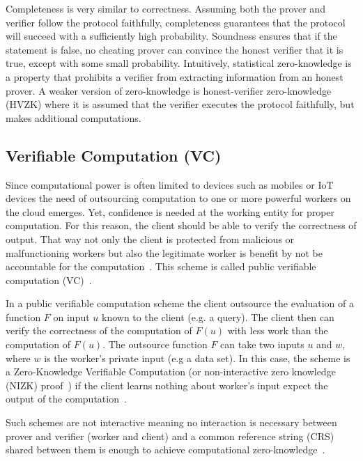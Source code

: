 Completeness is very similar to correctness. Assuming both the prover and verifier follow the protocol faithfully, completeness guarantees that the
protocol will succeed with a sufficiently high probability.
Soundness ensures that if the statement is false, no cheating prover can convince the honest verifier that it is true, except with some small probability.
Intuitively, statistical zero-knowledge is a property that prohibits a verifier from extracting information from an honest prover. A weaker version of zero-knowledge is honest-verifier zero-knowledge (HVZK) where it is assumed that the verifier executes the protocol faithfully, but makes additional computations.

\subsection{Verifiable Computation (VC)}
\label{zkp:vc}

Since computational power is often limited to devices such as mobiles or IoT devices the need of outsourcing computation to one or more powerful workers on the cloud emerges. Yet, confidence is needed at the working entity for proper computation. For this reason, the client should be able to verify the correctness of output. That way not only the client is protected from malicious or malfunctioning workers but also the legitimate worker is benefit by not be accountable for the computation~\cite{pinocchio-nearly-practical-verifiable-computation}. This scheme is called public verifiable computation (VC)~\cite{pinocchio-nearly-practical-verifiable-computation}.

In a public verifiable computation scheme the client outsource the evaluation of a function $F$ on input $u$ known to the client (e.g. a query). The client then can verify the correctness of the computation of $F(u)$ with less work than the computation of $F(u)$. The outsource function $F$ can take two inputs $u$ and $w$, where $w$ is the worker's private input (e.g a data set). In this case, the scheme is a Zero-Knowledge Verifiable Computation (or non-interactive zero knowledge (NIZK) proof~\cite{Blum:1991:NZ:123137.123145}) if the client learns nothing about worker's input expect the output of the computation~\cite{pinocchio-nearly-practical-verifiable-computation}.

Such schemes are not interactive meaning no interaction is necessary between prover and verifier (worker and client) and a common reference string (CRS) shared between them is enough to achieve computational zero-knowledge~\cite{Blum:1991:NZ:123137.123145}.

